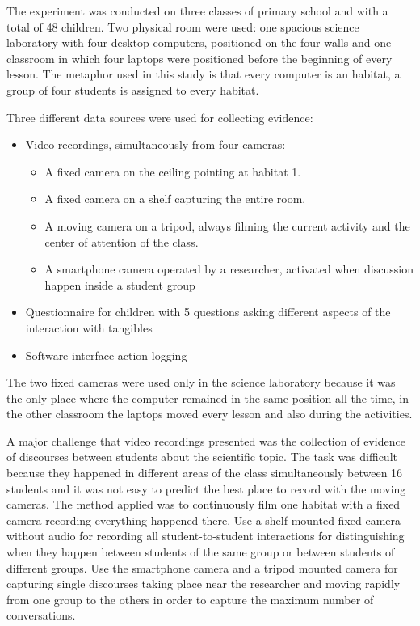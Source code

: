 The experiment was conducted on three classes of primary school and with a total of 48 children. Two physical room were used: one spacious science laboratory with four desktop computers, positioned on the four walls and one classroom in which four laptops were positioned before the beginning of every lesson. The metaphor used in this study is that every computer is an habitat, a group of four students is assigned to every habitat.

Three different data sources were used for collecting evidence:
\begin{itemize}
    \item Video recordings, simultaneously from four cameras:
    \begin{itemize}
        \item A fixed camera on the ceiling pointing at habitat 1.
        \item A fixed camera on a shelf capturing the entire room.
        \item A moving camera on a tripod, always filming the current activity and the center of attention of the class.
        \item A smartphone camera operated by a researcher, activated when discussion happen inside a student group
    \end{itemize}
    \item Questionnaire for children with 5 questions asking different aspects of the interaction with tangibles
    \item Software interface action logging
\end{itemize}

The two fixed cameras were used only in the science laboratory because it was the only place where the computer remained in the same position all the time, in the other classroom the laptops moved every lesson and also during the activities. 

A major challenge that video recordings presented was the collection of evidence of discourses between students about the scientific topic. The task was difficult because they happened in different areas of the class simultaneously between 16 students and it was not easy to predict the best place to record with the moving cameras. The method applied was to continuously film one habitat with a fixed camera recording everything happened there. Use a shelf mounted fixed camera without audio for recording all student-to-student interactions for distinguishing when they happen between students of the same group or between students of different groups. Use the smartphone camera and a tripod mounted camera for capturing single discourses taking place near the researcher and moving rapidly from one group to the others in order to capture the maximum number of conversations.

